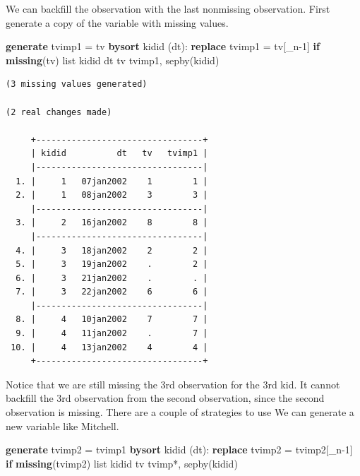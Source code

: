 \documentclass[
]{book}
\newenvironment{Shaded}{\begin{snugshade}}{\end{snugshade}}
\newcommand{\DataTypeTok}[1]{\textcolor[rgb]{0.13,0.29,0.53}{#1}}
\newcommand{\FunctionTok}[1]{\textcolor[rgb]{0.13,0.29,0.53}{\textbf{#1}}}
\newcommand{\KeywordTok}[1]{\textcolor[rgb]{0.13,0.29,0.53}{\textbf{#1}}}
\newcommand{\NormalTok}[1]{#1}
\newcommand{\OtherTok}[1]{\textcolor[rgb]{0.56,0.35,0.01}{#1}}
\begin{document}
We can backfill the observation with the last nonmissing observation.
First generate a copy of the variable with missing values.

\begin{Shaded}
\begin{Highlighting}[]
\KeywordTok{generate}\NormalTok{ tvimp1 = tv}
\KeywordTok{bysort}\NormalTok{ kidid (dt): }\KeywordTok{replace}\NormalTok{ tvimp1 = tv[}\DataTypeTok{\_n}\NormalTok{{-}1] }\KeywordTok{if} \FunctionTok{missing}\NormalTok{(tv)}
\OtherTok{list}\NormalTok{ kidid dt tv tvimp1, sepby(kidid)}
\end{Highlighting}
\end{Shaded}

\begin{verbatim}
(3 missing values generated)

(2 real changes made)

     +---------------------------------+
     | kidid          dt   tv   tvimp1 |
     |---------------------------------|
  1. |     1   07jan2002    1        1 |
  2. |     1   08jan2002    3        3 |
     |---------------------------------|
  3. |     2   16jan2002    8        8 |
     |---------------------------------|
  4. |     3   18jan2002    2        2 |
  5. |     3   19jan2002    .        2 |
  6. |     3   21jan2002    .        . |
  7. |     3   22jan2002    6        6 |
     |---------------------------------|
  8. |     4   10jan2002    7        7 |
  9. |     4   11jan2002    .        7 |
 10. |     4   13jan2002    4        4 |
     +---------------------------------+
\end{verbatim}

Notice that we are still missing the 3rd observation for the 3rd kid.
It cannot backfill the 3rd observation from the second observation, since
the second observation is missing. There are a couple of strategies to use
We can generate a new variable like Mitchell.

\begin{Shaded}
\begin{Highlighting}[]
\KeywordTok{generate}\NormalTok{ tvimp2 = tvimp1}
\KeywordTok{bysort}\NormalTok{ kidid (dt): }\KeywordTok{replace}\NormalTok{ tvimp2 = tvimp2[}\DataTypeTok{\_n}\NormalTok{{-}1] }\KeywordTok{if} \FunctionTok{missing}\NormalTok{(tvimp2)}
\OtherTok{list}\NormalTok{ kidid tv tvimp*, sepby(kidid)}
\end{Highlighting}
\end{Shaded}
\end{document}
